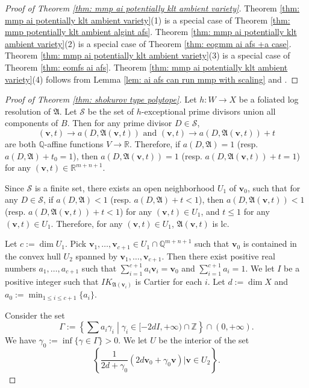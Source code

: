 \documentclass[12pt]{amsart}
\numberwithin{equation}{section}
\newcommand{\Aa}{{\mathfrak{A}}}
\newcommand{\Ii}{\Gamma}
\theoremstyle{definition}
\theoremstyle{definition}
\theoremstyle{definition}
\begin{document}
\begin{proof}[Proof of Theorem \ref{thm: mmp ai potentially klt ambient variety}]
    Theorem \ref{thm: mmp ai potentially klt ambient variety}(1) is a special case of Theorem \ref{thm: mmp potentially klt ambient algint afs}.  Theorem \ref{thm: mmp ai potentially klt ambient variety}(2) is a special case of Theorem \ref{thm: eogmm ai afs +a case}. Theorem \ref{thm: mmp ai potentially klt ambient variety}(3) is a special case of Theorem \ref{thm: eomfs ai afs}.  Theorem \ref{thm: mmp ai potentially klt ambient variety}(4) follows from  Lemma \ref{lem: ai afs can run mmp with scaling} and \cite[Theorem 1.11(1)]{LMX24}.
\end{proof}


\begin{proof}[Proof of Theorem \ref{thm: shokurov type polytope}]
Let $h: W\rightarrow X$ be a foliated log resolution of $\Aa$. Let $\mathcal{S}$ be the set of $h$-exceptional prime divisors union all components of $B$. Then for any prime divisor $D\in\mathcal{S}$,
$$(\bm{v},t)\rightarrow a(D,\Aa(\bm{v},t))\text{ and }(\bm{v},t)\rightarrow  a(D,\Aa(\bm{v},t))+t$$
are both $\mathbb Q$-affine functions $V\rightarrow\mathbb R$. Therefore, if $a(D,\Aa)=1$ (resp. $a(D,\Aa)+t_0=1$), then $a(D,\Aa(\bm{v},t))=1$ (resp. $a(D,\Aa(\bm{v},t))+t=1$) for any $(\bm{v},t)\in\mathbb R^{m+n+1}$.

Since $\mathcal{S}$ is a finite set, there exists an open neighborhood $U_1$ of $\bm{v}_0$, such that for any $D\in\mathcal{S}$, if $a(D,\Aa)<1$ (resp. $a(D,\Aa)+t<1$), then $a(D,\Aa(\bm{v},t))<1$ (resp. $a(D,\Aa(\bm{v},t))+t<1$) for any $(\bm{v},t)\in U_1$, and $t\leq 1$ for any $(\bm{v},t)\in U_1$. Therefore, for any $(\bm{v},t)\in U_1$, $\Aa(\bm{v},t)$ is lc.

Let $c:=\dim U_1$. Pick $\bm{v}_1,\dots,\bm{v}_{c+1}\in U_1\cap\mathbb Q^{m+n+1}$ such that $\bm{v}_0$ is contained in the convex hull $U_2$ spanned by $\bm{v}_1,\dots,\bm{v}_{c+1}$.  Then there exist positive real numbers $a_1,\dots,a_{c+1}$ such that $\sum_{i=1}^{c+1}a_i\bm{v}_i=\bm{v}_0$ and $\sum_{i=1}^{c+1}a_i=1$. We let $I$ be a positive integer such that $IK_{\Aa(\bm{v}_i)}$ is Cartier for each $i$. Let $d:=\dim X$ and $a_0:=\min_{1\leq i\leq c+1}\{a_i\}$. 

Consider the set
    $$\Ii:=\left\{\sum a_i\gamma_i\middle|\gamma_i\in [-2dI,+\infty)\cap\mathbb Z\right\}\cap (0,+\infty).$$
    We have $\gamma_0:=\inf\{\gamma\in\Ii\}>0$. We let $U$ be the interior of the set
    $$\left\{\frac{1}{2d+\gamma_0}(2d\bm{v}_0+\gamma_0\bm{v})\Bigg| \bm{v}\in U_2\right\}.$$


\end{proof}
\end{document}
